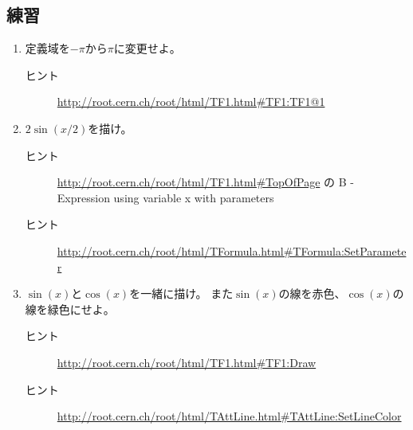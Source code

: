   \subsection{練習}
  \begin{enumerate}
   \item 定義域を$-\pi$から$\pi$に変更せよ。
	 \begin{description}
	  \item[ヒント]  \url{http://root.cern.ch/root/html/TF1.html#TF1:TF1@1}
	 \end{description}
   \item $2\sin(x/2)$を描け。
	 \begin{description}
	  \item[ヒント]  \url{http://root.cern.ch/root/html/TF1.html#TopOfPage} の
		     B - Expression using variable x with parameters
	  \item[ヒント]\url{http://root.cern.ch/root/html/TFormula.html#TFormula:SetParameter}
	 \end{description}
   \item $ \sin(x) $と$ \cos(x) $を一緒に描け。
	 また$\sin(x)$の線を赤色、$\cos(x)$の線を緑色にせよ。
	 \begin{description}
	  \item[ヒント]  \url{http://root.cern.ch/root/html/TF1.html#TF1:Draw}
	  \item[ヒント]  \url{http://root.cern.ch/root/html/TAttLine.html#TAttLine:SetLineColor}
	 \end{description}

  \end{enumerate}

